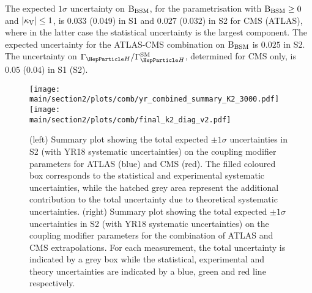 The expected $1\sigma$ uncertainty on $\mathrm{B_{BSM}}$, for the parametrisation with $\mathrm{B_{BSM}}\geq0$ and $|\kappa_{\mathrm{V}}|\leq1$, is $0.033$ ($0.049$) in S1 and $0.027$ ($0.032$) in S2 for CMS (ATLAS), where in the latter case the statistical uncertainty is the largest component.
The expected uncertainty for the ATLAS-CMS combination on  $\mathrm{B_{BSM}}$ is $0.025$ in S2.
The uncertainty on $\GammaSM$, determined for CMS only, is $0.05$ ($0.04$) in S1 (S2).

\begin{figure}[hbtp]
\centering
\texttt{[image: \\main/section2/plots/comb/yr\_combined\_summary\_K2\_3000.pdf]}%
\texttt{[image: \\main/section2/plots/comb/final\_k2\_diag\_v2.pdf]}%
\caption{(left) Summary plot showing the total expected $\pm 1\sigma$ uncertainties in S2 (with YR18 systematic uncertainties) on the coupling modifier parameters   for ATLAS (blue)  and CMS (red). The filled coloured box corresponds to the statistical and experimental systematic uncertainties, while the hatched grey area represent the additional contribution to the total uncertainty due to theoretical systematic uncertainties.
(right) Summary plot showing the total expected $\pm 1\sigma$  uncertainties in S2 (with YR18 systematic uncertainties) on the coupling modifier parameters for the combination of ATLAS and CMS extrapolations. For each measurement,  the total uncertainty is indicated by a grey box while the statistical, experimental and theory uncertainties are indicated by a blue, green and red line respectively.}
\label{fig:summary_K2}
\end{figure}


